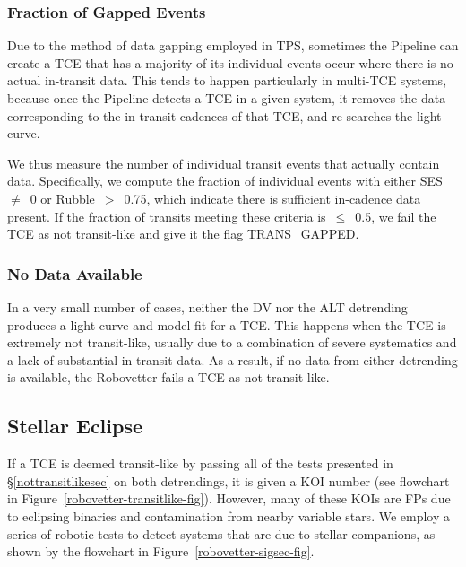 \subsubsection{Fraction of Gapped Events}
\label{s:rocky}

Due to the method of data gapping employed in TPS, sometimes the \kepler{} Pipeline can create a TCE that has a majority of its individual events occur where there is no actual in-transit data. This tends to happen particularly in multi-TCE systems, because once the \kepler{} Pipeline detects a TCE in a given system, it removes the data corresponding to the in-transit cadences of that TCE, and re-searches the light curve. 

We thus measure the number of individual transit events that actually contain data. Specifically, we compute the fraction of individual events with either SES~$\ne$~0 or Rubble~$>$~0.75, which indicate there is sufficient in-cadence data present. If the fraction of transits meeting these criteria is~$\le$~0.5, we fail the TCE as not transit-like and give it the flag TRANS\_GAPPED.



\subsubsection{No Data Available}
\label{s:nofits}

In a very small number of cases, neither the DV nor the ALT detrending produces a light curve and model fit for a TCE. This happens when the TCE is extremely not transit-like, usually due to a combination of severe systematics and a lack of substantial in-transit data. As a result, if no data from either detrending is available, the Robovetter fails a TCE as not transit-like.


\subsection{Stellar Eclipse}
\label{sigsecsec}

If a TCE is deemed transit-like by passing all of the tests presented in \S\ref{nottransitlikesec} on both detrendings, it is given a KOI number (see flowchart in Figure~\ref{robovetter-transitlike-fig}).
However, many of these KOIs are FPs due to eclipsing binaries and contamination from nearby variable stars. We employ a series of robotic tests to detect systems that are due to stellar companions, as shown by the flowchart in Figure~\ref{robovetter-sigsec-fig}.

